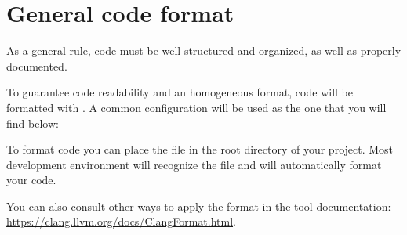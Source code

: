 \section{General code format}

As a general rule, code must be well structured and organized, as well as
properly documented.

To guarantee code readability and an homogeneous format, code will be formatted
with . A common configuration will be used as the one
that you will find below:



To format code you can place the file  in the root
directory of your project. Most development environment will recognize the file
and will automatically format your code.

You can also consult other ways to apply the format in the tool documentation:
\url{https://clang.llvm.org/docs/ClangFormat.html}.
